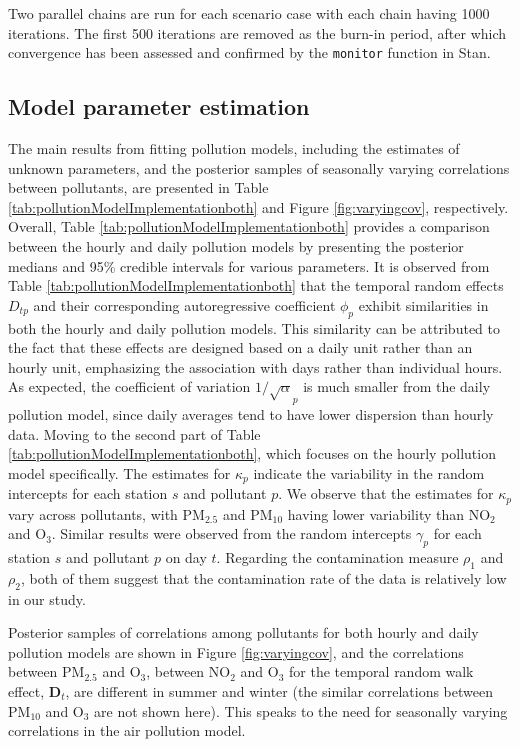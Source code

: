 \documentclass[
  12,
]{article}
\begin{document}
Two parallel chains are run for each scenario case with each chain
having 1000 iterations. The first 500 iterations are removed as the
burn-in period, after which convergence has been assessed and confirmed
by the \texttt{monitor} function in Stan.

\hypertarget{model-parameter-estimation}{%
\subsection{Model parameter
estimation}\label{model-parameter-estimation}}

The main results from fitting pollution models, including the estimates
of unknown parameters, and the posterior samples of seasonally varying
correlations between pollutants, are presented in Table
\ref{tab:pollutionModelImplementationboth} and Figure
\ref{fig:varyingcov}, respectively. Overall, Table
\ref{tab:pollutionModelImplementationboth} provides a comparison between
the hourly and daily pollution models by presenting the posterior
medians and 95\% credible intervals for various parameters. It is
observed from Table \ref{tab:pollutionModelImplementationboth} that the
temporal random effects \(D_{tp}\) and their corresponding
autoregressive coefficient \(\phi_p\) exhibit similarities in both the
hourly and daily pollution models. This similarity can be attributed to
the fact that these effects are designed based on a daily unit rather
than an hourly unit, emphasizing the association with days rather than
individual hours. As expected, the coefficient of variation
\(1/\sqrt\alpha_p\) is much smaller from the daily pollution model,
since daily averages tend to have lower dispersion than hourly data.
Moving to the second part of Table
\ref{tab:pollutionModelImplementationboth}, which focuses on the hourly
pollution model specifically. The estimates for \(\kappa_p\) indicate
the variability in the random intercepts for each station \(s\) and
pollutant \(p\). We observe that the estimates for \(\kappa_p\) vary
across pollutants, with PM\(_{2.5}\) and PM\(_{10}\) having lower
variability than NO\(_2\) and O\(_3\). Similar results were observed
from the random intercepts \(\gamma_p\) for each station \(s\) and
pollutant \(p\) on day \(t\). Regarding the contamination measure
\(\rho_1\) and \(\rho_2\), both of them suggest that the contamination
rate of the data is relatively low in our study.

Posterior samples of correlations among pollutants for both hourly and
daily pollution models are shown in Figure \ref{fig:varyingcov}, and the
correlations between PM\(_{2.5}\) and O\(_3\), between NO\(_2\) and
O\(_3\) for the temporal random walk effect, \(\symbf{D}_t\), are
different in summer and winter (the similar correlations between
PM\(_{10}\) and O\(_3\) are not shown here). This speaks to the need for
seasonally varying correlations in the air pollution model.
\end{document}
